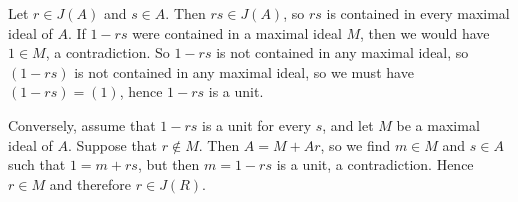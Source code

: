 Let $r \in J(A)$ and $s \in A$. Then $rs \in J(A)$, so $rs$ is contained in
every maximal ideal of $A$. If $1-rs$ were contained in a maximal ideal $M$,
then we would have $1 \in M$, a contradiction. So $1-rs$ is not contained in any
maximal ideal, so $(1-rs)$ is not contained in any maximal ideal, so we must have
$(1 - rs) = (1)$, hence $1 - rs$ is a unit.

Conversely, assume that $1-rs$ is a unit for every $s$, and let $M$ be a maximal
ideal of $A$. Suppose that $r \notin M$. Then $A = M + Ar$, so we find
$m \in M$ and  $s \in A$ such that $1 = m + rs$, but then $m = 1 - rs$ is a unit,
a contradiction. Hence $r \in M$ and therefore $r \in J(R)$.
